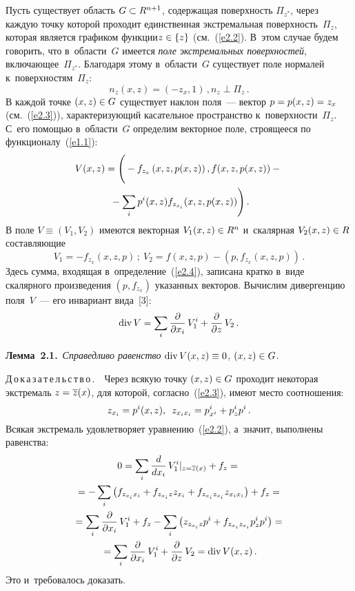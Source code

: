 \begin{multicols}{2}
    Пусть существует область $G\hm\subset R^{n+1}$, содержащая поверхность 
$\Pi_{z^*}$, через каждую точку которой проходит единственная экстремальная 
поверхность~$\Pi_z$, которая является графиком функции\linebreak $z\hm\in \{z\}$ 
(см.~(\ref{e2.2}). В~этом случае будем говорить, что в~области~$G$ имеется 
\textit{поле экстремальных поверхностей}, включающее~$\Pi_{z^*}$. Благодаря 
этому в~об\-ласти~$G$ существует поле нормалей к~поверхностям~$\Pi_z$:
    \begin{equation}
    n_z(x,z)=(-z_x, 1)\,, n_z \perp \Pi_z\,.
    \label{e2.3}
    \end{equation}
В каждой точке $(x,z)\hm\in G$ существует наклон поля~--- вектор $p\hm= 
p(x,z)\hm= z_x$ (см.~(\ref{e2.3})), характеризующий касательное пространство 
к~поверхности~$\Pi_z$. С~его помощью в~области~$G$ определим векторное поле, 
строящееся по функционалу~(\ref{e1.1}):
    \begin{multline}
    V(x,z) =\left(
    \vphantom{\sum\limits_i}
    -f_{z_x} \left(x,z,p(x,z)\right), f(x,z,p(x,z))-{}\right.\\
\left.    {}-\sum\limits_i p^i 
(x,z)f_{z_{x_i}}(x,z,p(x,z))\right).
    \label{e2.4}
    \end{multline}
В поле $V\equiv (V_1, V_2)$ имеются векторная $V_1(x,z)\hm\in R^n$ и~скалярная 
$V_2(x,z)\hm\in R$ составляющие 
$$
V_1= -f_{z_x} (x,z,p)\,;\
V_2= f(x,z,p)-\left(p,f_{z_x}(x,z,p)\right)\,.
$$
Здесь сумма, входящая в~определение~(\ref{e2.4}), записана кратко в~виде 
скалярного произведения $(p, f_{z_x})$ указанных векторов. Вычислим 
дивергенцию поля~$V$~--- его инвариант вида~[3]:
$$
\mathrm{div}\, V =\sum\limits_i \displaystyle\frac{\displaystyle \partial\mathstrut}{\displaystyle \partial x_i\mathstrut}\,V_1^i +\displaystyle\frac{\displaystyle \partial\mathstrut}{\displaystyle \partial z\mathstrut}\,V_2\,.
$$
    
    \noindent
    \textbf{Лемма~2.1.}\ \textit{Справедливо равенство} $\mathrm{div}\,V(x,z)\hm\equiv 0$, 
$(x,z)\hm\in G$.
    \smallskip
    
    \noindent
    Д\,о\,к\,а\,з\,а\,т\,е\,л\,ь\,с\,т\,в\,о\,.\ \ Через всякую точку $(x,z)\hm\in G$ 
проходит некоторая экстремаль $z\hm= \overline{z}(x)$, для которой, согласно~(\ref{e2.3}), имеют место соотношения:
    $$
    z_{x_i}= p^i (x,z),\enskip z_{x_ix_i} = p^i_{x^i} +p^i_z p^i\,.
    $$
Всякая экстремаль удовлетворяет уравнению~(\ref{e2.2}), а~значит, выполнены 
равенства:
\begin{multline*}
0=\sum\limits_i \displaystyle\frac{\displaystyle d\mathstrut}{\displaystyle dx_i\mathstrut}\,V_1^i\vert_{z=\overline{z}(x)} +f_z= {}\\
{}=-\sum\limits_i \left( 
f_{z_{x_i} x_i} +f_{z_{x_i}z} z_{x_i} +f_{z_{x_i}z_{x_i}} z_{x_i x_i}\right) 
+f_z={}\\
{}= \sum\limits_i \displaystyle\frac{\displaystyle \partial\mathstrut}{\displaystyle \partial x_i\mathstrut}\,V_1^i +f_z -\sum\limits_i \left(  z_{z_{x_i}z} 
p^i +f_{z_{x_i}z_{x_i}} p^i_z p^i\right) ={}\\
{}=\sum\limits_i \displaystyle\frac{\displaystyle \partial\mathstrut}{\displaystyle \partial x_i\mathstrut}\,V_1^i 
+\displaystyle\frac{\displaystyle \partial\mathstrut}{\displaystyle \partial z\mathstrut}\,V_2 =\mathrm{div}\,V(x,z)\,.
\end{multline*}
Это и~требовалось доказать.
    

\end{multicols}
